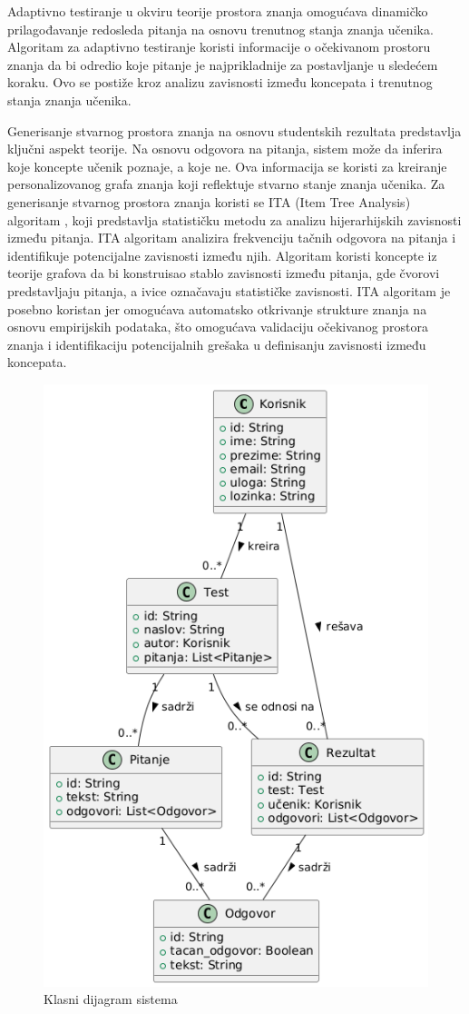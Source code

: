 \documentclass[conference]{IEEEtran}
\begin{document}
Adaptivno testiranje u okviru teorije prostora znanja omogućava dinamičko prilagođavanje redosleda pitanja na osnovu trenutnog stanja znanja učenika. Algoritam za adaptivno testiranje koristi informacije o očekivanom prostoru znanja da bi odredio koje pitanje je najprikladnije za postavljanje u sledećem koraku. Ovo se postiže kroz analizu zavisnosti između koncepata i trenutnog stanja znanja učenika.

Generisanje stvarnog prostora znanja na osnovu studentskih rezultata predstavlja ključni aspekt teorije. Na osnovu odgovora na pitanja, sistem može da inferira koje koncepte učenik poznaje, a koje ne. Ova informacija se koristi za kreiranje personalizovanog grafa znanja koji reflektuje stvarno stanje znanja učenika. Za generisanje stvarnog prostora znanja koristi se ITA (Item Tree Analysis) algoritam \cite{vanleeuwen2006}, koji predstavlja statističku metodu za analizu hijerarhijskih zavisnosti između pitanja. ITA algoritam analizira frekvenciju tačnih odgovora na pitanja i identifikuje potencijalne zavisnosti između njih. Algoritam koristi koncepte iz teorije grafova da bi konstruisao stablo zavisnosti između pitanja, gde čvorovi predstavljaju pitanja, a ivice označavaju statističke zavisnosti. ITA algoritam je posebno koristan jer omogućava automatsko otkrivanje strukture znanja na osnovu empirijskih podataka, što omogućava validaciju očekivanog prostora znanja i identifikaciju potencijalnih grešaka u definisanju zavisnosti između koncepata.

\begin{figure}[H]
\centering
\includegraphics[width=0.8\columnwidth]{Klasni_dijagram.png}
\caption{Klasni dijagram sistema}
\end{figure}
\end{document}
